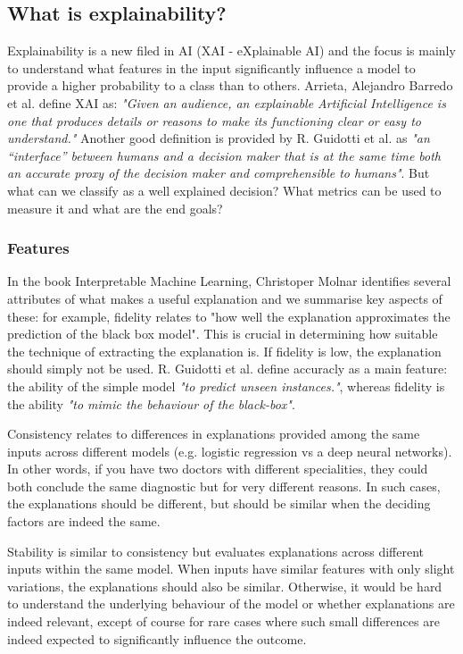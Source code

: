 \documentclass[proposal]{softeng}
\begin{document}
\subsection{What is explainability?}
Explainability is a new filed in AI (XAI - eXplainable AI) and the focus is mainly to understand what features in the input significantly influence a model to provide a higher probability to a class than to others. Arrieta, Alejandro Barredo et al.\cite{BarredoArrietaAlejandro2020EAIX} define XAI as: \textit{"Given an audience, an explainable Artificial Intelligence is one that produces details or reasons to make its functioning clear or easy to understand."} Another good definition is provided by R. Guidotti et al. \cite{guidotti} as \textit{"an “interface” between humans and a decision maker that is at the same time both an accurate proxy of the decision maker and comprehensible to humans"}. But what can we classify as a well explained decision? What metrics can be used to measure it and what are the end goals?

\subsubsection{Features}
In the book Interpretable Machine Learning, Christoper Molnar \cite{molnar2019} identifies several attributes of what makes a useful explanation and we summarise key aspects of these: for example, fidelity relates to "how well the explanation approximates the prediction of the black box model". This is crucial in determining how suitable the technique of extracting the explanation is. If fidelity is low, the explanation should simply not be used. R. Guidotti et al. \cite{guidotti} define accuracly as a main feature: the ability of the simple model \textit{"to predict unseen instances."}, whereas fidelity is the ability \textit{"to mimic the behaviour of the black-box"}.

Consistency relates to differences in explanations provided among the same inputs across different models (e.g. logistic regression vs a deep neural networks). In other words, if you have two doctors with different specialities, they could both conclude the same diagnostic but for very different reasons. In such cases, the explanations should be different, but should be similar when the deciding factors are indeed the same.

Stability is similar to consistency but evaluates explanations across different inputs within the same model. When inputs have similar features with only slight variations, the explanations should also be similar. Otherwise, it would be hard to understand the underlying behaviour of the model or whether explanations are indeed relevant, except of course for rare cases where such small differences are indeed expected to significantly influence the outcome.
\end{document}
